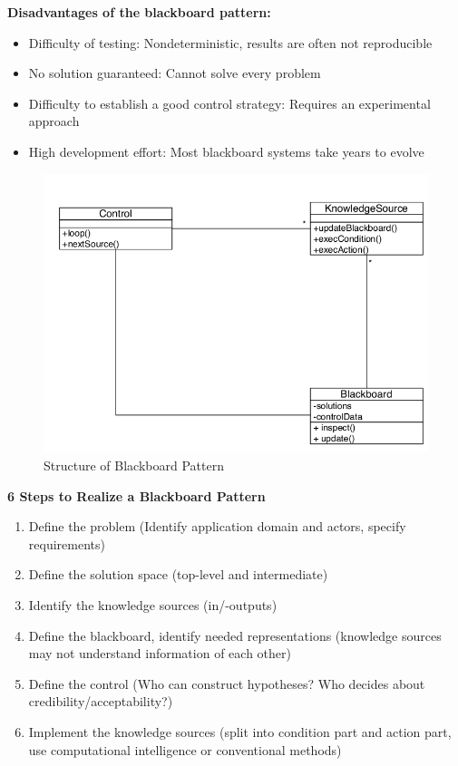 \textbf{Disadvantages of the blackboard pattern:}
\begin{itemize}[topsep=5pt, itemsep=0pt]
	\item Difficulty of testing:
		\subitem Nondeterministic, results are often not reproducible
	\item No solution guaranteed:
		\subitem Cannot solve every problem
	\item Difficulty to establish a good control strategy:
		\subitem Requires an experimental approach
	\item High development effort:
		\subitem Most blackboard systems take years to evolve
\end{itemize}
\newpage

\begin{figure}[h]
	\centering
	\includegraphics[width=0.85\linewidth]{images/pattern_blackboard.png}
	\caption{Structure of Blackboard Pattern}
\end{figure}

\textbf{6 Steps to Realize a Blackboard Pattern}
\begin{enumerate}
	\item Define the problem (Identify application domain and actors, specify requirements)
	\item Define the solution space (top-level and intermediate)
	\item Identify the knowledge sources (in/-outputs)
	\item Define the blackboard, identify needed representations (knowledge sources may not understand information of each other)
	\item Define the control (Who can construct hypotheses? Who decides about credibility/acceptability?)
	\item Implement the knowledge sources (split into condition part and action part, use computational intelligence or conventional methods)
\end{enumerate}
\newpage

